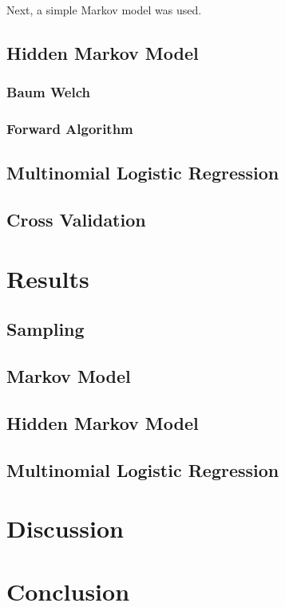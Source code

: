 \documentclass{article}
\begin{document}
Next, a simple Markov model was used. 

\subsection{Hidden Markov Model}

\subsubsection{Baum Welch}

\subsubsection{Forward Algorithm}

\subsection{Multinomial Logistic Regression}

\subsection{Cross Validation}

\section{Results}

\subsection{Sampling}

\subsection{Markov Model}

\subsection{Hidden Markov Model}

\subsection{Multinomial Logistic Regression}

\section{Discussion}


\section{Conclusion}
\end{document}
